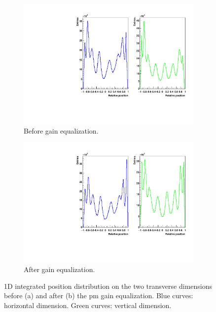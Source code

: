 \begin{figure}
\begin{subfigure}[t]{0.5\textwidth}
\centering
\includegraphics[width=1\textwidth]{03_GraphicFiles/chapter3_CLaRySproto/Absorber/images_charResults_Na22/1_Raw_profileXY_int.pdf}
\caption{Before gain equalization.}
\label{chap3::fig::abssingleAxisRawProfile}
\end{subfigure}
\begin{subfigure}[t]{0.5\textwidth}
\centering
\includegraphics[width=1\textwidth]{03_GraphicFiles/chapter3_CLaRySproto/Absorber/images_charResults_Na22/2_Cal_profileXY_int.pdf}
\caption{After gain equalization.}
\label{chap3::fig::abssingleAxisCalProfile}
\end{subfigure}
\caption{1D integrated position distribution on the two transverse dimensions before (a) and after (b) the \gls{pm} gain equalization. Blue curves: horizontal dimension. Green curves: vertical dimension.}
\label{chap3::fig::absXYprofiles}
\end{figure}

